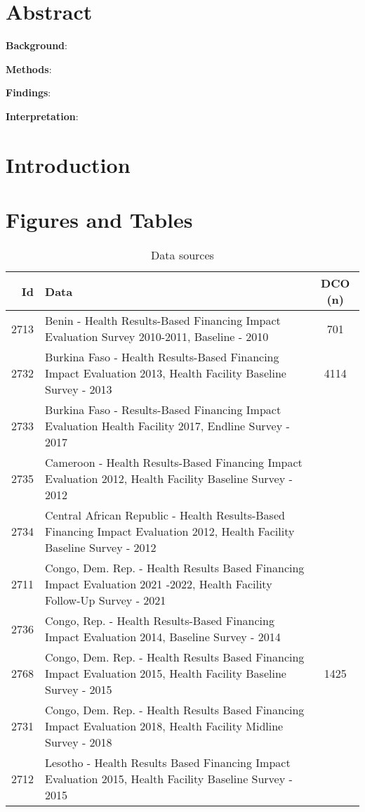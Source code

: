 \documentclass{article}
\date{}
\begin{document}
\vspace*{0.2in}


\title{}
\maketitle
\section*{Abstract}
\textbf{Background}: 

\textbf{Methods}:

\textbf{Findings}: 

\textbf{Interpretation}: 

\section*{Introduction}
\section*{Figures and Tables}
\begin{table}[ht]
\centering
\begin{tabular}{@{}r >{\raggedright\arraybackslash}p{10cm} c@{}}
\toprule
\textbf{Id} & \textbf{Data} & \textbf{DCO (n)} \\
\midrule
2713 & Benin - Health Results-Based Financing Impact Evaluation Survey 2010-2011, Baseline - 2010 & 701\\
2732 & Burkina Faso - Health Results-Based Financing Impact Evaluation 2013, Health Facility Baseline Survey - 2013 & 4114\\
2733 & Burkina Faso - Results-Based Financing Impact Evaluation Health Facility 2017, Endline Survey - 2017 & \\
2735 & Cameroon - Health Results-Based Financing Impact Evaluation 2012, Health Facility Baseline Survey - 2012 & \\
2734 & Central African Republic - Health Results-Based Financing Impact Evaluation 2012, Health Facility Baseline Survey - 2012 & \\
2711 & Congo, Dem. Rep. - Health Results Based Financing Impact Evaluation 2021 -2022, Health Facility Follow-Up Survey - 2021 & \\
2736 & Congo, Rep. - Health Results-Based Financing Impact Evaluation 2014, Baseline Survey - 2014 & \\
2768 & Congo, Dem. Rep. - Health Results Based Financing Impact Evaluation 2015, Health Facility Baseline Survey - 2015 & 1425 \\
2731 & Congo, Dem. Rep. - Health Results Based Financing Impact Evaluation 2018, Health Facility Midline Survey - 2018 & \\
2712 & Lesotho - Health Results Based Financing Impact Evaluation 2015, Health Facility Baseline Survey - 2015 & \\
\bottomrule
\end{tabular}
\caption{Data sources}
\label{tab:data sources}
\end{table}
\end{document}
